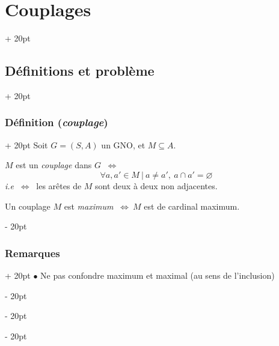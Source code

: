 \documentclass[a4paper, 12pt, twoside]{article}
\newcommand{\ssi}{\ \Leftrightarrow \ }
\newcommand{\ind}[1][20pt]{\advance\leftskip + #1}
\newcommand{\deind}[1][20pt]{\advance\leftskip - #1}
\newenvironment{indt}[2][20pt]{#2 \par \ind[#1]}{\par \deind} %
\begin{document}
    \begin{indt}{\section{Couplages}}
        \begin{indt}{\subsection{Définitions et problème}}
            \begin{indt}{\subsubsection{Définition (\textit{couplage})}}
                Soit $G = (S, A)$ un GNO, et $M \subseteq A$.

                $M$ est un \textit{couplage} dans $G$ $\ssi$
                \[
                    \forall a, a' \in M\ |\ a \neq a',\ a \cap a' = \varnothing
                \]
                \textit{i.e} $\ssi$ les arêtes de $M$ sont deux à deux non adjacentes.

                \vspace{6pt}
                
                Un couplage $M$ est \textit{maximum} $\ssi M$ est de cardinal maximum.
            \end{indt}

            \vspace{12pt}
            
            \begin{indt}{\subsubsection{Remarques}}
                $\bullet$ Ne pas confondre maximum et maximal (au sens de l'inclusion)

                \begin{center}
\end{center}
\end{indt}
\end{indt}
\end{indt}
\end{document}
